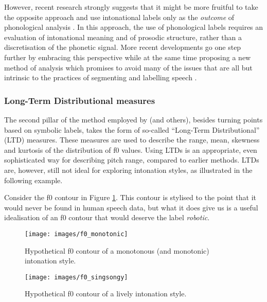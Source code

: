 However, recent research strongly suggests that it might be more fruitful to take the opposite approach and use intonational labels only as the \emph{outcome} of phonological analysis \citep{cangemiImportanceDistributionalApproach2016,frotaSurfaceStructureTranscribing2016}. In this approach, the use of phonological labels requires an evaluation of intonational meaning and of prosodic structure, rather than a discretisation of the phonetic signal. More recent developments go one step further by embracing this perspective while at the same time proposing a new method of analysis which promises to avoid many of the issues that are all but intrinsic to the practices of segmenting and labelling speech \citep{albertUsingPeriodicEnergy2018,albertModelSonorityBased2023,cangemiModellingIntonationSegments2019}.

	\subsubsection{Long-Term Distributional measures}\label{int_back_measures_LTD}


The second pillar of the method employed by \citet{mennenCrosslanguageDifferencesFundamental2012a} (and others), besides turning points based on symbolic labels, takes the form of so-called ``Long-Term Distributional'' (LTD) measures. These measures are used to describe the range, mean, skewness and kurtosis of the distribution of f0 values. Using LTDs is an appropriate, even sophisticated way for describing pitch range, compared to earlier methods. LTDs are, however, still not ideal for exploring intonation styles, as illustrated in the following example.

Consider the f0 contour in Figure \ref{fig:Monotonic}. This contour is stylised to the point that it would never be found in human speech data, but what it does give us is a useful idealisation of an f0 contour that would deserve the label \textit{robotic}.



\begin{figure}[p]
	
	{\texttt{[image: images/f0\_monotonic]}
		
	}
	
	\caption{Hypothetical f0 contour of a monotonous (and monotonic) intonation style.}\label{fig:Monotonic}
\end{figure}

\begin{figure}[p]
	
	{\texttt{[image: images/f0\_singsongy]}
		
	}
	
	\caption{Hypothetical f0 contour of a lively intonation style.}\label{fig:Singsongy}
\end{figure}

